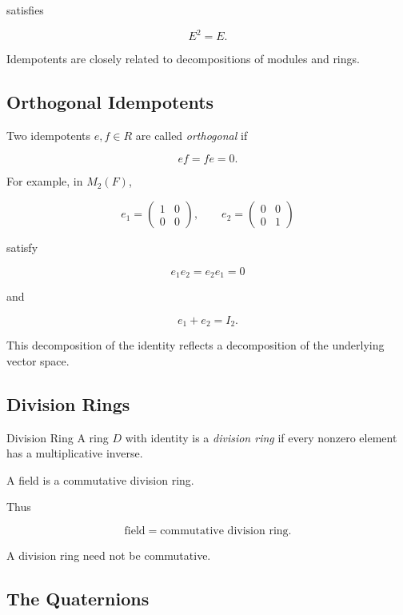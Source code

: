 satisfies

\[ E^2=E. \]

Idempotents are closely related to decompositions of modules and rings.

\subsection{Orthogonal Idempotents}
\label{subsec:orthogonal-idempotents}

Two idempotents \(e,f\in R\) are called \emph{orthogonal} if

\[ ef=fe=0. \]

For example, in \(M_2(F)\),

\[ e_1=\begin{pmatrix}1&0\\0&0\end{pmatrix},\qquad
e_2=\begin{pmatrix}0&0\\0&1\end{pmatrix} \]

satisfy

\[ e_1e_2=e_2e_1=0 \]

and

\[ e_1+e_2=I_2. \]

This decomposition of the identity reflects a decomposition of the
underlying vector space.

\subsection{Division Rings}
\label{subsec:division-rings}

\begin{definitionbox}{Division Ring}
A ring \(D\) with identity is a \emph{division ring} if every nonzero
element has a multiplicative inverse.
\end{definitionbox}

A field is a commutative division ring.

Thus

\[ \text{field}=\text{commutative division ring}. \]

A division ring need not be commutative.

\subsection{The Quaternions}
\label{subsec:quaternions}

